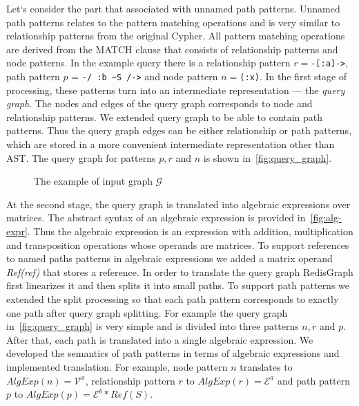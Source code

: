 Let`s consider the part that associated with unnamed path patterns. Unnamed path patterns relates to the pattern matching operations and is very similar to relationship patterns from the original Cypher. All pattern matching operations are derived from the MATCH clause that consists of relationship patterns and node patterns. In the example query there is a relationship pattern $r = $\lstinline{-[:a]->}, path pattern $p$ = \lstinline{-/ :b ~S /->} and node pattern $n = $\lstinline{(:x)}. In the first stage of processing, these patterns turn into an intermediate representation --- the \textit{query graph}. The nodes and edges of the query graph corresponds to node and relationship patterns. We extended query graph to be able to contain path patterns. Thus the query graph edges can be either relationship or path patterns, which are stored in a more convenient intermediate representation other than AST. The query graph for patterns $p, r$ and $n$ is shown in~\autoref{fig:query_graph}.

\begin{figure}[h]
    \centering        
    \caption{The example of input graph $\mathcal{G}$}
    \label{fig:query_graph}
\end{figure}

At the second stage, the query graph is translated into algebraic expressions over matrices. The abstract syntax of an algebraic expression is provided in~\autoref{fig:alg-expr}. Thus the algebraic expression is an expression with addition, multiplication and transposition operations whose operands are matrices. To support references to named paths patterns in algebraic expressions we added a matrix operand \textit{Ref(ref)} that stores a reference. In order to translate the query graph RedisGraph first linearizes it and then splits it into small paths. To support path patterns we extended the split processing so that each path pattern corresponds to exactly one path after query graph splitting. For example the query graph in~\autoref{fig:query_graph} is very simple and is divided into three patterns $n, r$ and $p$. After that, each path is translated into a single algebraic expression. We developed the semantics of path patterns in terms of algebraic expressions and implemented translation. For example, node pattern $n$ translates to $AlgExp(n) = \mathcal{V}^x$, relationship pattern $r$ to $AlgExp(r) = \mathcal{E}^a$ and path pattern $p$ to $AlgExp(p) = \mathcal{E}^b * Ref(S)$.


